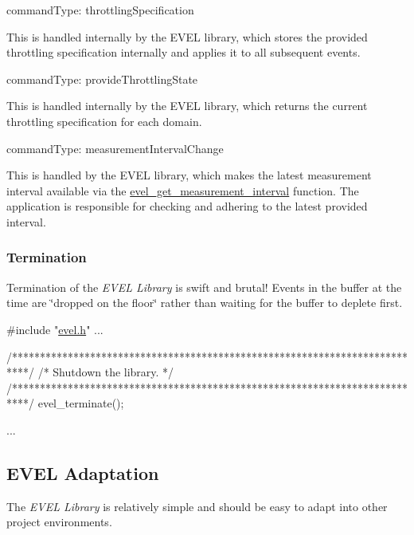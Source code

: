 \begin{DoxyEnumerate}
\item command\+Type\+: throttling\+Specification

This is handled internally by the E\+V\+EL library, which stores the provided throttling specification internally and applies it to all subsequent events.
\item command\+Type\+: provide\+Throttling\+State

This is handled internally by the E\+V\+EL library, which returns the current throttling specification for each domain.
\item command\+Type\+: measurement\+Interval\+Change

This is handled by the E\+V\+EL library, which makes the latest measurement interval available via the \hyperlink{evel__throttle_8c_a5d0335c5b5e1220473b92497800ec036}{evel\+\_\+get\+\_\+measurement\+\_\+interval} function. The application is responsible for checking and adhering to the latest provided interval.
\end{DoxyEnumerate}\hypertarget{quickstart_qs_termination}{}\subsubsection{Termination}\label{quickstart_qs_termination}
Termination of the {\itshape E\+V\+EL Library} is swift and brutal! Events in the buffer at the time are \char`\"{}dropped on the floor\char`\"{} rather than waiting for the buffer to deplete first.


\begin{DoxyCode}
\textcolor{preprocessor}{#include "\hyperlink{evel_8h}{evel.h}"}
...

\textcolor{comment}{/***************************************************************************/}
\textcolor{comment}{/* Shutdown the library.                                                   */}
\textcolor{comment}{/***************************************************************************/}
evel\_terminate();

...
\end{DoxyCode}
\hypertarget{quickstart_qs_adaptation}{}\subsection{E\+V\+E\+L Adaptation}\label{quickstart_qs_adaptation}
The {\itshape E\+V\+EL Library} is relatively simple and should be easy to adapt into other project environments.

